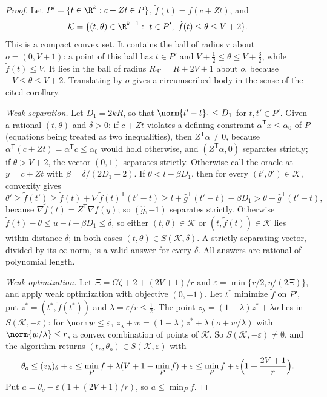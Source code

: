\begin{proof}
Let $P'=\{t\in\R^k:c+Zt\in P\}$, $\tilde f(t)=f(c+Zt)$, and
\[
 \mathcal K=\{(t,\theta)\in\R^{k+1}:\ t\in P',\ \tilde f(t)\le\theta\le V+2\}.
\]
This is a compact convex set. It contains the ball of radius $r$ about
$o=(0,V+1)$: a point of this ball has $t\in P'$ and
$V+\frac12\le\theta\le V+\frac32$, while $\tilde f(t)\le V$. It lies in the
ball of radius $R_{\mathcal K}=R+2V+1$ about $o$, because
$-V\le\theta\le V+2$. Translating by $o$ gives a circumscribed body in the
sense of the cited corollary.

\emph{Weak separation.} Let $D_1=2kR$, so that
$\norm{t'-t}_1\le D_1$ for $t,t'\in P'$. Given a rational $(t,\theta)$ and
$\delta>0$: if $c+Zt$ violates a defining constraint $\alpha^{\mathsf T}x\le
\alpha_0$ of $P$ (equations being treated as two inequalities), then
$Z^{\mathsf T}\alpha\ne0$, because $\alpha^{\mathsf T}(c+Zt)=\alpha^{\mathsf
T}c\le\alpha_0$ would hold otherwise, and $(Z^{\mathsf T}\alpha,0)$ separates
strictly; if $\theta>V+2$, the vector $(0,1)$ separates strictly. Otherwise
call the oracle at $y=c+Zt$ with $\beta=\delta/(2D_1+2)$. If
$\theta<l-\beta D_1$, then for every $(t',\theta')\in\mathcal K$, convexity
gives
\[
 \theta'\ge\tilde f(t')\ge\tilde f(t)+\nabla\tilde f(t)^{\mathsf T}(t'-t)
 \ge l+\hat g^{\mathsf T}(t'-t)-\beta D_1>\theta+\hat g^{\mathsf T}(t'-t),
\]
because $\nabla\tilde f(t)=Z^{\mathsf T}\nabla f(y)$; so $(\hat g,-1)$
separates strictly. Otherwise
$\tilde f(t)-\theta\le u-l+\beta D_1\le\delta$, so either
$(t,\theta)\in\mathcal K$ or $(t,\tilde f(t))\in\mathcal K$ lies within
distance $\delta$; in both cases $(t,\theta)\in S(\mathcal K,\delta)$. A
strictly separating vector, divided by its $\infty$-norm, is a valid answer
for every $\delta$. All answers are rational of polynomial length.

\emph{Weak optimization.} Let $\Xi=G\zeta+2+(2V+1)/r$ and
$\varepsilon=\min\{r/2,\eta/(2\Xi)\}$, and apply weak optimization with
objective $(0,-1)$. Let $t^*$ minimize $\tilde f$ on $P'$, put
$z^*=(t^*,\tilde f(t^*))$ and $\lambda=\varepsilon/r\le\frac12$. The point
$z_\lambda=(1-\lambda)z^*+\lambda o$ lies in $S(\mathcal K,-\varepsilon)$:
for $\norm w\le\varepsilon$,
$z_\lambda+w=(1-\lambda)z^*+\lambda(o+w/\lambda)$ with
$\norm{w/\lambda}\le r$, a convex combination of points of $\mathcal K$.
So $S(\mathcal K,-\varepsilon)\ne\emptyset$, and the algorithm returns
$(t_o,\theta_o)\in S(\mathcal K,\varepsilon)$ with
\[
 \theta_o\le(z_\lambda)_\theta+\varepsilon
 \le\min_Pf+\lambda(V+1-\min_Pf)+\varepsilon
 \le\min_Pf+\varepsilon\Bigl(1+\frac{2V+1}r\Bigr).
\]
Put $a=\theta_o-\varepsilon(1+(2V+1)/r)$, so $a\le\min_Pf$.


\end{proof}
